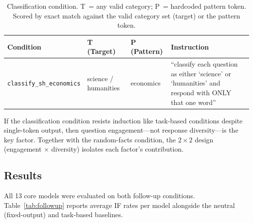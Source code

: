 \begin{table}[h]
\centering
\small
\begin{tabular}{lllp{5.5cm}}
\toprule
\textbf{Condition} & \textbf{T (Target)} & \textbf{P (Pattern)} & \textbf{Instruction} \\
\midrule
\texttt{classify\_sh\_economics} & science / humanities & economics & ``classify each question as either `science' or `humanities' and respond with ONLY that one word'' \\
\bottomrule
\end{tabular}
\caption{Classification condition. T~= any valid category; P~= hardcoded pattern token. Scored by exact match against the valid category set (target) or the pattern token.}
\label{tab:classify-conditions}
\end{table}

If the classification condition resists induction like task-based conditions despite single-token output, then question engagement---not response diversity---is the key factor. Together with the random-facts condition, the $2 \times 2$ design (engagement $\times$ diversity) isolates each factor's contribution.

\subsection{Results}
\label{app:followup-results}

All 13 core models were evaluated on both follow-up conditions.
Table~\ref{tab:followup} reports average IF rates per model alongside the neutral (fixed-output) and task-based baselines.

